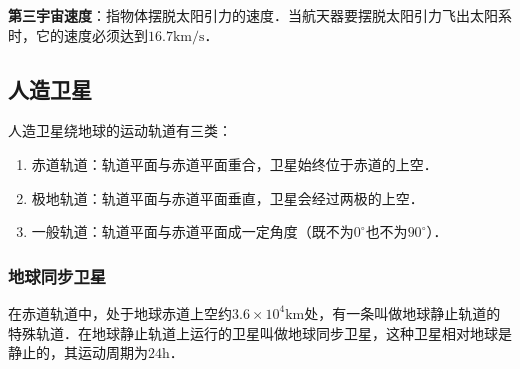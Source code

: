 \textbf{第三宇宙速度}：指物体摆脱太阳引力的速度．当航天器要摆脱太阳引力飞出太阳系时，它的速度必须达到$16.7\mathrm{km/s}$．

\subsection{人造卫星}

人造卫星绕地球的运动轨道有三类：

\begin{enumerate}
\item 赤道轨道：轨道平面与赤道平面重合，卫星始终位于赤道的上空．
\item 极地轨道：轨道平面与赤道平面垂直，卫星会经过两极的上空．
\item 一般轨道：轨道平面与赤道平面成一定角度（既不为$0^\circ$也不为$90^\circ$）．
\end{enumerate}

\subsubsection{地球同步卫星}

在赤道轨道中，处于地球赤道上空约$3.6\times10^4\mathrm{km}$处，有一条叫做地球静止轨道的特殊轨道．在地球静止轨道上运行的卫星叫做地球同步卫星，这种卫星相对地球是静止的，其运动周期为$24\mathrm{h}$．
